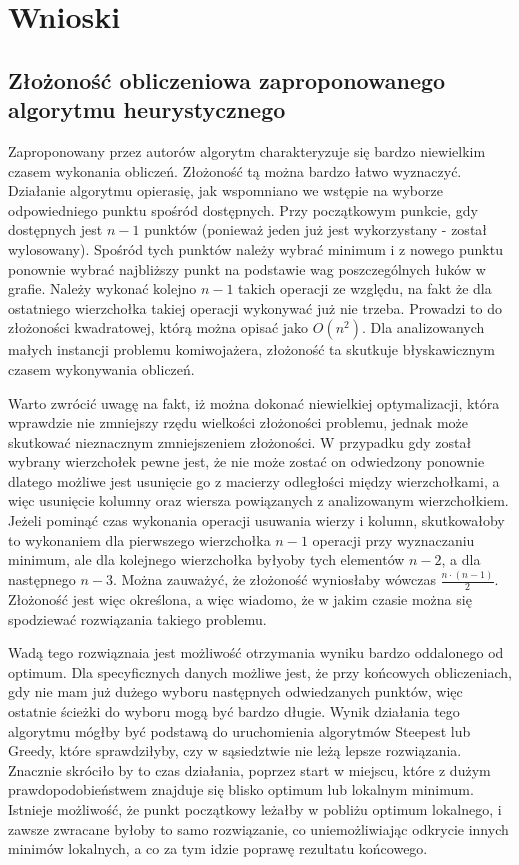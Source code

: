 \section{Wnioski}

\subsection{Złożoność obliczeniowa zaproponowanego algorytmu heurystycznego}

Zaproponowany przez autorów algorytm charakteryzuje się bardzo niewielkim
czasem wykonania obliczeń. Złożoność tą można bardzo łatwo wyznaczyć.
Działanie algorytmu opierasię, jak wspomniano we wstępie na wyborze
odpowiedniego punktu spośród dostępnych. Przy początkowym punkcie, gdy
dostępnych jest $n - 1$ punktów (ponieważ jeden już jest wykorzystany - 
został wylosowany). Spośród tych punktów należy wybrać minimum i
z nowego punktu ponownie wybrać najbliższy punkt na podstawie wag
poszczególnych łuków w grafie. Należy wykonać kolejno $n - 1$
takich operacji ze względu, na fakt że dla ostatniego 
wierzchołka takiej operacji wykonywać już nie trzeba. Prowadzi to do
złożoności kwadratowej, którą można opisać jako $ O(n^{2}) $.
Dla analizowanych małych instancji problemu komiwojażera, złożoność ta
skutkuje błyskawicznym czasem wykonywania obliczeń.

Warto zwrócić uwagę na fakt, iż można dokonać niewielkiej optymalizacji,
która wprawdzie nie zmniejszy rzędu wielkości złożoności problemu, jednak
może skutkować nieznacznym zmniejszeniem złożoności. W przypadku gdy został
wybrany wierzchołek pewne jest, że nie może zostać on odwiedzony ponownie
dlatego możliwe jest usunięcie go z macierzy odległości między
wierzchołkami, a więc usunięcie kolumny oraz wiersza powiązanych z
analizowanym wierzchołkiem. Jeżeli pominąć czas wykonania
operacji usuwania wierzy i kolumn, skutkowałoby to wykonaniem dla pierwszego
wierzchołka $n - 1$ operacji przy wyznaczaniu minimum, ale dla kolejnego
wierzchołka byłyoby tych elementów $n - 2$, a dla następnego $n - 3$.
Można zauważyć, że złożoność wyniosłaby wówczas $\frac{n \cdot (n - 1)}{2}$.
Złożoność jest więc określona, a więc wiadomo, że w jakim czasie
można się spodziewać rozwiązania takiego problemu.

Wadą tego rozwiąznaia jest
możliwość otrzymania wyniku bardzo oddalonego od optimum. Dla specyficznych
danych możliwe jest, 
że przy końcowych obliczeniach, gdy nie mam już dużego wyboru następnych
odwiedzanych punktów, więc ostatnie ścieżki do wyboru mogą być bardzo długie.
Wynik działania tego algorytmu mógłby być podstawą do uruchomienia
algorytmów Steepest lub Greedy, które sprawdziłyby, czy w sąsiedztwie
nie leżą lepsze rozwiązania. Znacznie skróciło
by to czas działania, poprzez start w miejscu, które z dużym
prawdopodobieństwem znajduje się blisko optimum lub lokalnym minimum.
Istnieje możliwość, że punkt początkowy leżałby w pobliżu optimum
lokalnego, i zawsze zwracane byłoby to samo rozwiązanie, co
uniemożliwiając odkrycie
innych minimów lokalnych, a co za tym idzie
poprawę rezultatu końcowego.

